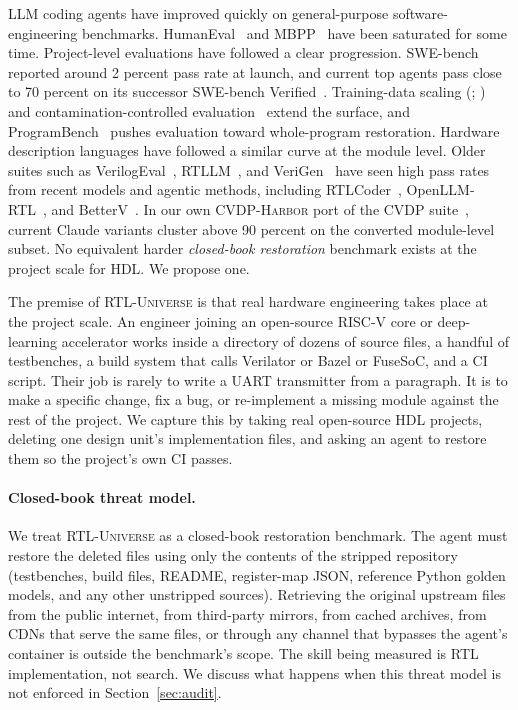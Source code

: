 \documentclass{article}
\begin{document}
LLM coding agents have improved quickly on general-purpose software-engineering benchmarks.
HumanEval~\citep{humaneval} and MBPP~\citep{mbpp} have been saturated for some time.
Project-level evaluations have followed a clear progression. SWE-bench~\citep{swebench}
reported around 2 percent pass rate at launch, and current top agents pass close to 70
percent on its successor SWE-bench Verified~\citep{openai2024swebenchverified}. Training-data
scaling (\citealp{swesmith}; \citealp{sweuniverse}) and contamination-controlled
evaluation~\citep{livecodebench} extend the surface, and
ProgramBench~\citep{programbench} pushes evaluation toward whole-program restoration.
Hardware description languages have followed a similar curve at the module level. Older
suites such as VerilogEval~\citep{verilogeval}, RTLLM~\citep{rtllm}, and
VeriGen~\citep{verigen} have seen high pass rates from recent models and agentic methods,
including RTLCoder~\citep{rtlcoder}, OpenLLM-RTL~\citep{openllmrtl}, and
BetterV~\citep{betterv}. In our own \textsc{CVDP-Harbor} port of the
CVDP suite~\citep{nvidia2024cvdp}, current Claude variants cluster above 90 percent on the
converted module-level subset. No equivalent harder \emph{closed-book restoration}
benchmark exists at the project scale for HDL. We propose one.

The premise of \textsc{RTL-Universe} is that real hardware engineering takes place at the
project scale. An engineer joining an open-source RISC-V core or deep-learning accelerator
works inside a directory of dozens of source files, a handful of testbenches, a build system
that calls Verilator or Bazel or FuseSoC, and a CI script. Their job is rarely to write a
UART transmitter from a paragraph. It is to make a specific change, fix a bug, or
re-implement a missing module against the rest of the project. We capture this by taking
real open-source HDL projects, deleting one design unit's implementation files, and asking
an agent to restore them so the project's own CI passes.

\paragraph{Closed-book threat model.}
We treat \textsc{RTL-Universe} as a closed-book restoration benchmark. The agent must restore
the deleted files using only the contents of the stripped repository (testbenches, build
files, README, register-map JSON, reference Python golden models, and any other unstripped
sources). Retrieving the original upstream files from the public internet, from third-party
mirrors, from cached archives, from CDNs that serve the same files, or through any channel
that bypasses the agent's container is outside the benchmark's scope. The skill being
measured is RTL implementation, not search. We discuss what happens when this threat model
is not enforced in Section~\ref{sec:audit}.
\end{document}
